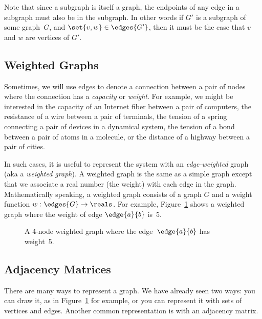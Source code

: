 Note that since a subgraph is itself a graph, the endpoints of any edge in
a subgraph must also be in the subgraph.  In other words if $G'$ is a
subgraph of some graph~$G$, and $\set{ v, w } \in \edges{G'}$, then it
must be the case that $v$ and $w$ are vertices of $G'$.

\subsection{Weighted Graphs}

Sometimes, we will use edges to denote a connection between a pair of
nodes where the connection has a \emph{capacity} or \emph{weight}.
For example, we might be interested in the capacity of an Internet
fiber between a pair of computers, the resistance of a wire between a
pair of terminals, the tension of a spring connecting a pair of
devices in a dynamical system, the tension of a bond between a pair of
atoms in a molecule, or the distance of a highway between a pair of
cities.

In such cases, it is useful to represent the system with an
\emph{edge-weighted} graph (aka a \emph{weighted graph}).  A weighted
graph is the same as a simple graph except that we associate a real
number (\ie the weight) with each edge in the graph.  Mathematically
speaking, a weighted graph consists of a graph $G$ and a
weight function $w: \edges{G} \to \reals$.  For example,
Figure~\ref{fig:weighted_graph} shows a weighted graph where the
weight of edge $\edge{a}{b}$ is~5.

\begin{figure}


\caption{A 4-node weighted graph where the edge~$\edge{a}{b}$ has
  weight~5.}
\label{fig:weighted_graph}
\end{figure}

\subsection{Adjacency Matrices}

There are many ways to represent a graph.  We have already seen two ways:
you can draw it, as in Figure~\ref{fig:weighted_graph} for example, or you
can represent it with sets of vertices and edges.  Another common
representation is with an adjacency matrix.

